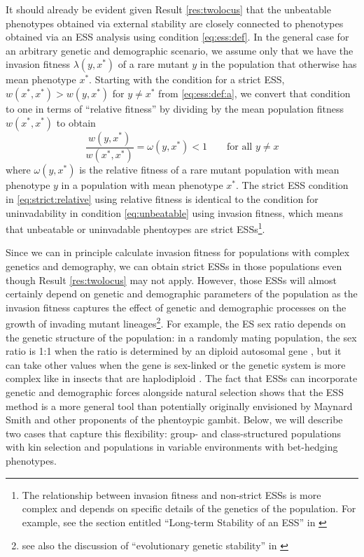 \documentclass[11pt]{article}
\newcommand{\ess}[1]{#1^*}
\newcommand{\eig}{\lambda}
\begin{document}
It should already be evident given Result \ref{res:twolocus} that the unbeatable phenotypes obtained via external stability are closely connected to phenotypes obtained via an ESS analysis using condition \eqref{eq:ess:def}. In the general case for an arbitrary genetic and demographic scenario, we assume only that we have the invasion fitness $\eig(y, \ess{x})$ of a rare mutant $y$ in the population that otherwise has mean phenotype $\ess{x}$. Starting with the condition for a strict ESS, $w(\ess{x}, \ess{x}) > w(y, \ess{x})$ for $y \ne \ess{x}$ from \eqref{eq:ess:def:a}, we convert that condition to one in terms of ``relative fitness'' by dividing by the mean population fitness $w(\ess{x}, \ess{x})$ to obtain
\begin{equation}
  \label{eq:strict:relative}
  \frac{w(y, \ess{x})}{w(\ess{x}, \ess{x})} = \omega(y, \ess{x}) < 1 \qquad \text{for all } y \ne x
\end{equation}
where $\omega(y, \ess{x})$ is the relative fitness of a rare mutant population with mean phenotype $y$ in a population with mean phenotype $\ess{x}$. The strict ESS condition in \eqref{eq:strict:relative} using relative fitness is identical to the condition for uninvadability in condition \eqref{eq:unbeatable} using invasion fitness, which means that unbeatable or uninvadable phentoypes are strict ESSs\footnote{The relationship between invasion fitness and non-strict ESSs is more complex and depends on specific details of the genetics of the population. For example, see the section entitled ``Long-term Stability of an ESS'' in \cite{Eshel:Feldman:1998}}.

Since we can in principle calculate invasion fitness for populations with complex genetics and demography, we can obtain strict ESSs in those populations even though Result \ref{res:twolocus} may not apply. However, those ESSs will almost certainly depend on genetic and demographic parameters of the population as the invasion fitness captures the effect of genetic and demographic processes on the growth of invading mutant lineages\footnote{see also the discussion of ``evolutionary genetic stability'' in \cite[pp. 505--506]{Eshel:1996}}. For example, the ES sex ratio depends on the genetic structure of the population: in a randomly mating population, the sex ratio is 1:1 when the ratio is determined by an diploid autosomal gene \cite{Fisher:1958,Hamilton:1967,Eshel:Feldman:1982}, but it can take other values when the gene is sex-linked or the genetic system is more complex like in insects that are haplodiploid \cite{Hamilton:1967,Eshel:Feldman:1982a}. The fact that ESSs can incorporate genetic and demographic forces alongside natural selection shows that the ESS method is a more general tool than potentially originally envisioned by Maynard Smith and other proponents of the phentoypic gambit. Below, we will describe two cases that capture this flexibility: group- and class-structured populations with kin selection and populations in variable environments with bet-hedging phenotypes.
\end{document}
